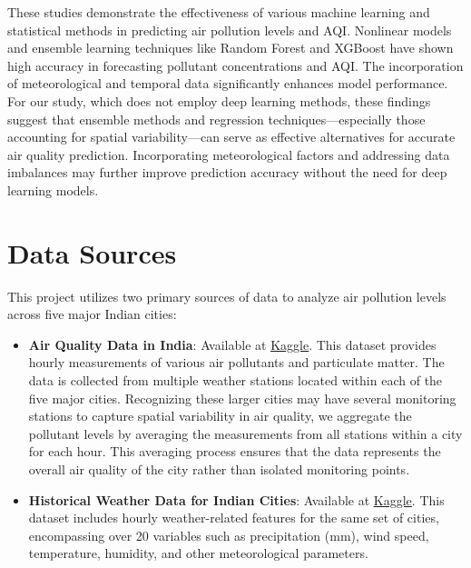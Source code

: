 \documentclass[twoside,11pt]{article}
\begin{document}
These studies demonstrate the effectiveness of various machine learning and statistical methods in predicting air pollution levels and AQI. Nonlinear models and ensemble learning techniques like Random Forest and XGBoost have shown high accuracy in forecasting pollutant concentrations and AQI. The incorporation of meteorological and temporal data significantly enhances model performance. For our study, which does not employ deep learning methods, these findings suggest that ensemble methods and regression techniques—especially those accounting for spatial variability—can serve as effective alternatives for accurate air quality prediction. Incorporating meteorological factors and addressing data imbalances may further improve prediction accuracy without the need for deep learning models.

\newpage






\section{Data Sources}

This project utilizes two primary sources of data to analyze air pollution levels across five major Indian cities:

\begin{itemize}
    \item \textbf{Air Quality Data in India}: Available at \href{https://www.kaggle.com/datasets/rohanrao/air-quality-data-in-india}{\uline{Kaggle}}. This dataset provides hourly measurements of various air pollutants and particulate matter. The data is collected from multiple weather stations located within each of the five major cities. Recognizing these larger cities may have several monitoring stations to capture spatial variability in air quality, we aggregate the pollutant levels by averaging the measurements from all stations within a city for each hour. This averaging process ensures that the data represents the overall air quality of the city rather than isolated monitoring points.

    \item \textbf{Historical Weather Data for Indian Cities}: Available at \href{https://www.kaggle.com/datasets/hiteshsoneji/historical-weather-data-for-indian-cities}{\uline{Kaggle}}. This dataset includes hourly weather-related features for the same set of cities, encompassing over 20 variables such as precipitation (mm), wind speed, temperature, humidity, and other meteorological parameters. \citep{hitesh_soneji_2020}
\end{itemize}
\end{document}
